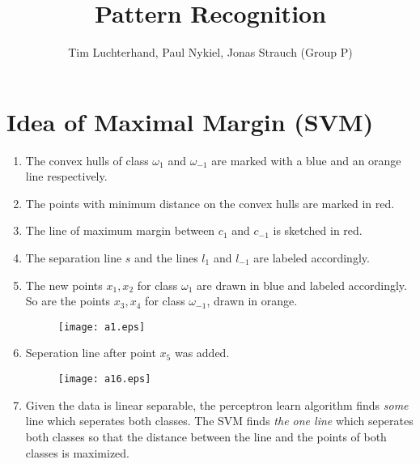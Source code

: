 \documentclass[DIN, pagenumber=false, fontsize=11pt, parskip=half]{scrartcl}
\title{Pattern Recognition}
\author{Tim Luchterhand, Paul Nykiel, Jonas Strauch (Group P)}
\begin{document}
    \maketitle
    \section{Idea of Maximal Margin (SVM)}
    \begin{enumerate}
        \item
        The convex hulls of class $\omega_1$ and $\omega_{-1}$ are marked with a blue and an orange line respectively.
        \item
        The points with minimum distance on the convex hulls are marked in red.
        \item
        The line of maximum margin between $c_1$ and $c_{-1}$ is sketched in red.
        \item
        The separation line $s$ and the lines $l_1$ and $l_{-1}$ are labeled accordingly.
        \item
        The new points $x_1, x_2$ for class $\omega_1$ are drawn in blue and labeled accordingly. So are the points $x_3, x_4$
        for class $\omega_{-1}$, drawn in orange.
        \begin{figure}[h!]
            \centering
            \texttt{[image: a1.eps]}
        \end{figure}
        \newpage
        \item
        Seperation line after point $x_5$ was added. 
        \begin{figure}[h!]
            \centering
            \texttt{[image: a16.eps]}
        \end{figure}
        \item
        Given the data is linear separable, the perceptron learn algorithm finds \textit{some} line which seperates both classes. The
        SVM finds \textit{the one line} which seperates both classes so that the distance between the line and the points of both classes is maximized.
    \end{enumerate}
\end{document}
